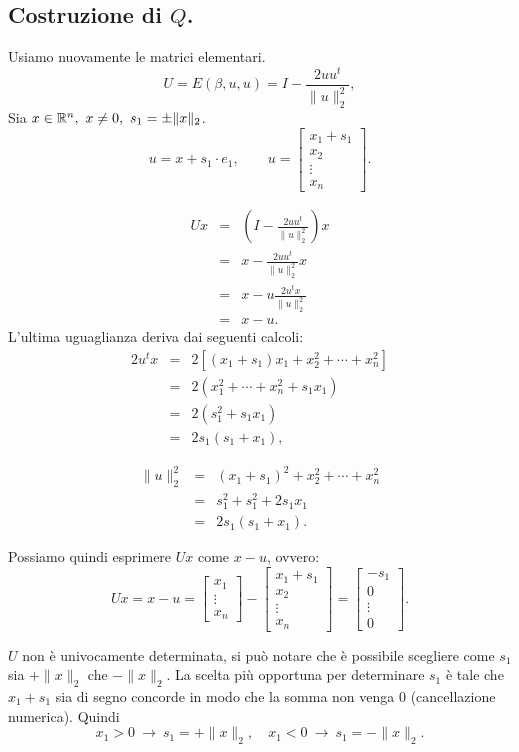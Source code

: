\subsection{Costruzione di $Q$.}
Usiamo nuovamente le matrici elementari.
\[U = E(\beta, u, u) = I - \frac{2uu^t}{\| u \|_2^2},\]
Sia $x \in \mathbb{R}^n, \ x \neq 0, \ s_1 = \pm \|x \|_2$.
\[u = x + s_1\cdot e_1, \qquad u =
\left[
\begin{array}{c}
x_1 + s_1 \\
x_2 \\
\vdots \\
x_n
\end{array}
\right]. \]

\[
\begin{array}{lcl}
 Ux & = & \left(I - \frac{2uu^t}{\| u \|_2^2}\right)x \\
 & = & x - \frac{2uu^t}{\| u \|_2^2}x \\
 & = & x - u\frac{2u^tx}{\| u \|_2^2} \\
 & = & x - u.
 \end{array}
\]
L'ultima uguaglianza deriva dai seguenti calcoli:
\[
 \begin{array}{lcl}
 2u^tx & = & 2[(x_1+s_1)x_1 + x_2^2 + \cdots + x_n^2] \\
       & = & 2(x_1^2 + \cdots + x_n^2 + s_1x_1) \\
       & = & 2(s_1^2 + s_1x_1) \\
       & = & 2s_1(s_1 +x_1),
 \end{array}
\]

\[
 \begin{array}{lcl}
 \|u\|_2^2 & = & (x_1+s_1)^2 + x_2^2 + \cdots + x_n^2 \\
          & = & s_1^2 + s_1^2 +2s_1x_1 \\
          & = & 2s_1(s_1 +x_1).
 \end{array}
\]

Possiamo quindi esprimere $Ux$ come $ x - u$, ovvero:
\[Ux = x -u =
\left[
\begin{array}{c}
x_1 \\
\vdots \\
x_n
\end{array}\right] -
\left[
\begin{array}{c}
x_1 + s_1 \\
x_2 \\
\vdots \\
x_n
\end{array}\right] =
\left[
\begin{array}{c}
-s_1 \\
0 \\
\vdots \\
0
\end{array}\right].
\]
\begin{osse}
\label{oss_qr_unicita}
$U$ non è univocamente determinata, si può notare che è
possibile scegliere come $s_1$ sia $+ \|x\|_2$ che $- \|x\|_2$. La scelta
più opportuna per determinare $s_1$ è tale che $x_1 + s_1$ sia di segno
concorde in modo che la somma non venga $0$ (cancellazione numerica). Quindi
\[x_1 > 0\ \longrightarrow\ s_1 = + \|x\|_2, \quad
x_1 < 0\ \longrightarrow\ s_1 = - \|x\|_2.\]
\end{osse}

